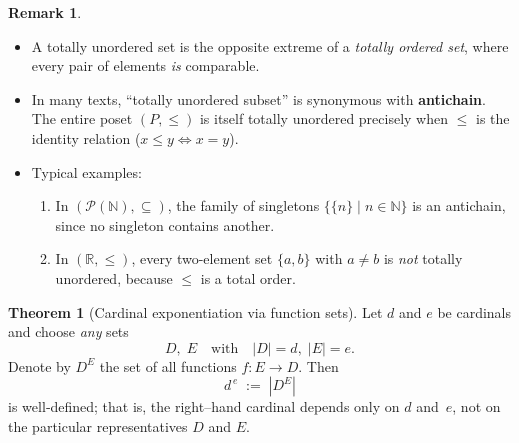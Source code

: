 \documentclass[12pt]{article}
\theoremstyle{definition} %
\newtheorem{theorem}{Theorem}
\newtheorem{remark}{Remark}
\theoremstyle{plain} %
\begin{document}
    \begin{remark}
    \begin{itemize}
      \item A totally unordered set is the opposite extreme of a
            \emph{totally ordered set}, where every pair of elements
            \emph{is} comparable.
      \item In many texts, “totally unordered subset” is synonymous with
            \textbf{antichain}.
            The entire poset $(P,\le)$ is itself totally unordered precisely
            when $\le$ is the identity relation ($x\le y\!\iff\!x=y$).
      \item Typical examples:
            \begin{enumerate}
              \item In $(\mathcal P(\mathbb N),\subseteq)$,
                    the family of singletons
                    $\{\{n\}\mid n\in\mathbb N\}$ is an antichain,
                    since no singleton contains another.
              \item In $(\mathbb R,\le)$, every two-element set
                    $\{a,b\}$ with $a\neq b$ is \emph{not} totally unordered,
                    because $\le$ is a total order.
            \end{enumerate}
    \end{itemize}
    \end{remark}
    \begin{theorem}[Cardinal exponentiation via function sets]
      \label{thm:card-exp}
      Let $d$ and $e$ be cardinals and choose \emph{any} sets
      \[
        D,\;E \quad\text{with}\quad |D| = d,\; |E| = e.
      \]
      Denote by $D^{E}$ the set of all functions $f\colon E\to D$.
      Then
      \[
        d^{\,e} \;:=\; |D^{E}|
      \]
      is well‑defined; that is, the right–hand cardinal depends only on
      $d$ and~$e$, not on the particular representatives $D$ and $E$.
      \end{theorem}
      
\end{document}
